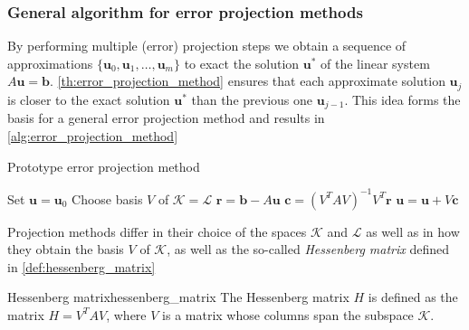 \subsubsection{General algorithm for error projection methods}
By performing multiple (error) projection steps we obtain a sequence of approximations $\{\mathbf{u}_0, \mathbf{u}_1, \dots, \mathbf{u}_m\}$ to exact the solution $\mathbf{u}^*$ of the linear system $A\mathbf{u} = \mathbf{b}$. \cref{th:error_projection_method} ensures that each approximate solution $\mathbf{u}_j$ is closer to the exact solution $\mathbf{u}^*$ than the previous one $\mathbf{u}_{j-1}$. This idea forms the basis for a general error projection method and results in \cref{alg:error_projection_method}
\begin{algorithm}[H]
    \caption{Prototype error projection method \cite[Algorithm 5.1]{iter_method_saad}}
    \begin{algorithmic}
      \State Set $\mathbf{u} = \mathbf{u}_0$
      \State Choose basis $V$ of $\mathcal{K}=\mathcal{L}$
      \State $\mathbf{r} = \mathbf{b} - A \mathbf{u}$
      \State $\mathbf{c} = (V^TAV)^{-1}V^T\mathbf{r}$
      \State $\mathbf{u} = \mathbf{u} + V\mathbf{c}$
      \EndWhile
    \end{algorithmic}
    \label{alg:error_projection_method}
\end{algorithm}
Projection methods differ in their choice of the spaces $\mathcal{K}$ and $\mathcal{L}$ as well as in how they obtain the basis $V$ of $\mathcal{K}$, as well as the so-called \textit{Hessenberg matrix} defined in \cref{def:hessenberg_matrix}
\begin{fancydef}{Hessenberg matrix}{hessenberg_matrix}
  The Hessenberg matrix $H$ is defined as the matrix $H = V^TAV$, where $V$ is a matrix whose columns span the subspace $\mathcal{K}$.
  \label{def:hessenberg_matrix}
\end{fancydef}

